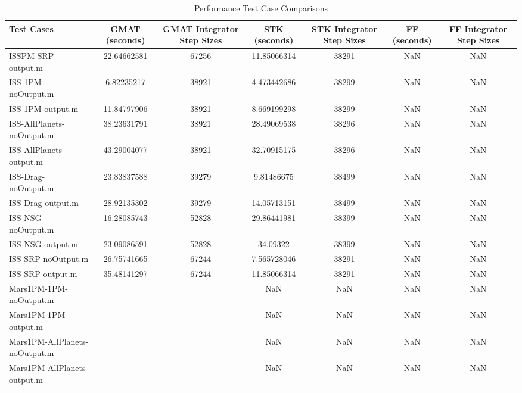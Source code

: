 \begin{table}[htbp!]
\centering
\caption{ Performance Test Case Comparisons}
      \begin{tabular}{lcccccc}
      \hline\hline
          Test Cases & GMAT (seconds) & GMAT Integrator Step Sizes & STK (seconds) & STK Integrator Step Sizes & FF (seconds) & FF Integrator Step Sizes \\
         \hline
         ISSPM-SRP-output.m & 22.64662581 & 67256 & 11.85066314 & 38291 & NaN & NaN \\
         ISS-1PM-noOutput.m & 6.82235217 & 38921 & 4.473442686 & 38299 & NaN & NaN \\
         ISS-1PM-output.m & 11.84797906 & 38921 & 8.669199298 & 38299 & NaN & NaN \\
         ISS-AllPlanets-noOutput.m & 38.23631791 & 38921 & 28.49069538 & 38296 & NaN & NaN \\
         ISS-AllPlanets-output.m & 43.29004077 & 38921 & 32.70915175 & 38296 & NaN & NaN \\
         ISS-Drag-noOutput.m & 23.83837588 & 39279 & 9.81486675 & 38499 & NaN & NaN \\
         ISS-Drag-output.m & 28.92135302 & 39279 & 14.05713151 & 38499 & NaN & NaN \\
         ISS-NSG-noOutput.m & 16.28085743 & 52828 & 29.86441981 & 38399 & NaN & NaN \\
         ISS-NSG-output.m & 23.09086591 & 52828 & 34.09322 & 38399 & NaN & NaN \\
         ISS-SRP-noOutput.m & 26.75741665 & 67244 & 7.565728046 & 38291 & NaN & NaN \\
         ISS-SRP-output.m & 35.48141297 & 67244 & 11.85066314 & 38291 & NaN & NaN \\
         Mars1PM-1PM-noOutput.m &  &  & NaN & NaN & NaN & NaN \\
         Mars1PM-1PM-output.m &  &  & NaN & NaN & NaN & NaN \\
         Mars1PM-AllPlanets-noOutput.m &  &  & NaN & NaN & NaN & NaN \\
         Mars1PM-AllPlanets-output.m &  &  & NaN & NaN & NaN & NaN \\

\end{tabular}
\end{table}
